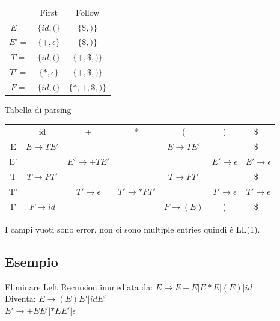 \begin{tabular}{ccc}
              &   First                    &   Follow                   \\    
    $E=$      &    $\{ id, ( \}$           &   $\{ \$, ) \}$            \\
    $E'=$     &    $\{ +, \epsilon \}$     &   $\{ \$, ) \}$            \\
    $T=$      &    $\{ id, ( \}$           &   $\{ +, \$, ) \}$         \\
    $T'=$     &    $\{ *, \epsilon \}$     &   $\{ +, \$, ) \}$         \\
    $F=$      &    $\{ id, ( \}$           &   $\{ *, +, \$, ) \}$      \\
\end{tabular}

Tabella di parsing

\begin{tabular}{|c|c|c|c|c|c|c|}
        &   id      &    +   &   *   &   (   &   )   &   $\$$\   \\
    E   &   $E \rightarrow TE' $    &  & &   $E \rightarrow TE' $   &      &   $\$$\   \\
    E'  &   &    $E' \rightarrow +TE' $ &      &      &   $E' \rightarrow \epsilon $   &  $E' \rightarrow \epsilon $   \\
    T   &   $T \rightarrow FT' $    &  & &   $T \rightarrow FT' $   & &   $\$$\   \\
    T'  &   & $T' \rightarrow \epsilon $ & $T' \rightarrow *FT' $   & &   $T' \rightarrow \epsilon $   &   $T' \rightarrow \epsilon $ \\
    F   &   $F \rightarrow id $ &  &  &   $F \rightarrow (E) $   &   )   &   $\$$\   \\
\end{tabular}
I campi vuoti sono error, non ci sono multiple entries quindi \'e LL(1).

\subsection{Esempio}

Eliminare Left Recursion immediata da:
$E \rightarrow E + E | E * E | (E) |id $\\

Diventa:
$E \rightarrow (E)E' | id E' $\\
$E' \rightarrow +EE'| *EE' | \epsilon $\\

